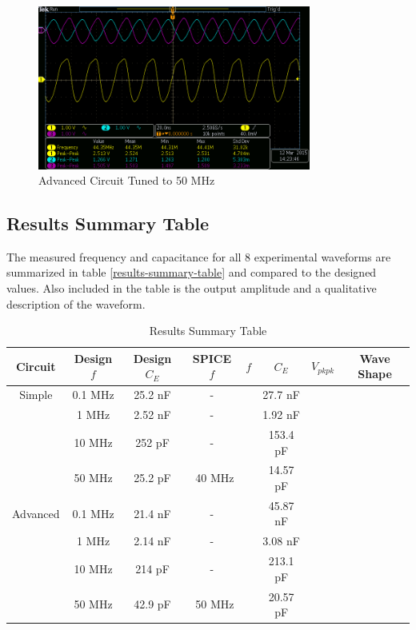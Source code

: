 \documentclass[titlepage, letterpaper, 10.5pt]{article}
\begin{document}
\begin{figure}[ht]
	\centering
	\includegraphics[width=0.8\textwidth]{results/advanced-50MHz}
	\caption{Advanced Circuit Tuned to 50 MHz}
	\label{advanced-50MHz}
\end{figure}

\subsection{Results Summary Table}

The measured frequency and capacitance for all 8 experimental waveforms are
summarized in table \ref{results-summary-table} and compared to the designed values.
Also included in the table is the output amplitude and a qualitative description of the waveform.

\begin{table}[ht]
\centering
\caption{Results Summary Table}
\begin{tabular}{c | c | c | c | c | c | c | c}
\hline\hline
Circuit	&Design $f$	&Design $C_{E}$	&SPICE $f$	&$f$	&$C_{E}$	&$V_{pkpk}$	&Wave Shape	\\
\hline\hline
Simple	&0.1 MHz	&25.2 nF		&-			&		&27.7 nF	&			&	\\
		&1 MHz		&2.52 nF		&-			&		&1.92 nF	&			&	\\
		&10 MHz		&252 pF			&-			&		&153.4 pF	&			&	\\
		&50 MHz		&25.2 pF		&~40 MHz	&		&14.57 pF	&			&	\\
\hline
Advanced&0.1 MHz	&21.4 nF		&-			&		&45.87 nF	&			&	\\
		&1 MHz		&2.14 nF		&-			&		&3.08 nF	&			&	\\
		&10 MHz		&214 pF			&-			&		&213.1 pF	&			&	\\
		&50 MHz		&42.9 pF		&~50 MHz	&		&20.57 pF	&			&	\\
\hline\hline
\end{tabular}
\end{table}
\clearpage
\end{document}
